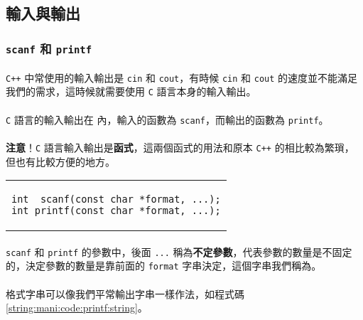 \documentclass[12pt,a4paper,oneside]{article}
\begin{document}
\begin{CJK}{UTF8}{bkai}
\subsection{輸入與輸出}

\subsubsection{\lstinline!scanf! 和 \lstinline!printf!}

\paragraph{}\texttt{C++} 中常使用的輸入輸出是 \lstinline!cin! 和 \lstinline!cout!，有時候 \lstinline!cin! 和 \lstinline!cout! 的速度並不能滿足我們的需求，這時候就需要使用 \texttt{C} 語言本身的輸入輸出。
\paragraph{}\texttt{C} 語言的輸入輸出在  內，輸入的函數為 \lstinline!scanf!，而輸出的函數為 \lstinline!printf!。
\paragraph{}{\color{red}\textbf{注意}}！\texttt{C} 語言輸入輸出是\textbf{函式}，這兩個函式的用法和原本 \texttt{C++} 的相比較為繁瑣，但也有比較方便的地方。

\begin{code}[h!]
  \centering
  \begin{tabular}{c}
  \begin{lstlisting}
int  scanf(const char *format, ...);
int printf(const char *format, ...);
  \end{lstlisting}
  \end{tabular}
  \caption{\lstinline!scanf! 和 \lstinline!printf!}
  \label{string:mani:code:scanf:and:printf}
\end{code}

\paragraph{}\lstinline!scanf! 和 \lstinline!printf! 的參數中，後面 \lstinline!...! 稱為\textbf{不定參數}，代表參數的數量是不固定的，決定參數的數量是靠前面的 \lstinline!format! 字串決定，這個字串我們稱為。
\paragraph{}格式字串可以像我們平常輸出字串一樣作法，如程式碼 \ref{string:mani:code:printf:string}。


\end{CJK}
\end{document}
